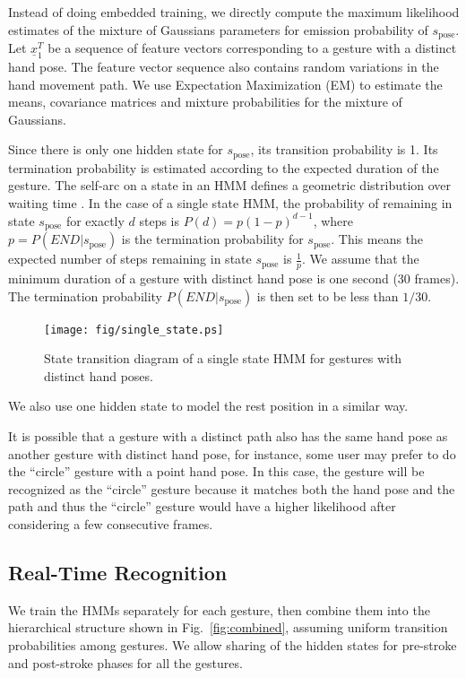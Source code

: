 Instead of doing embedded
training, we directly compute the maximum likelihood estimates of the mixture of
Gaussians parameters for emission probability of  $s_{\text{pose}}$. Let
$\underline{x}_1^T$ be a sequence of feature vectors corresponding to a gesture with a distinct hand pose. 
The feature vector sequence also contains random variations in the hand movement
path. 
We use Expectation Maximization (EM) to estimate the means, covariance matrices
and mixture probabilities for the mixture of Gaussians.

Since there is only one hidden state for $s_{\text{pose}}$, its transition
probability is 1. Its termination probability is estimated according to the
expected duration of the gesture. The self-arc on a state in an HMM defines a 
geometric distribution over waiting time \cite{murphy02}. In the case of a
single state HMM, the probability of remaining in state $s_{\text{pose}}$ for
exactly $d$ steps is $P(d) = p(1-p)^{d - 1}$, where $p = P(END|s_\text{pose})$
is the termination probability for $s_{\text{pose}}$. This means the expected
number of steps remaining in state $s_{\text{pose}}$ is $\frac{1}{p}$. We assume
that the minimum duration of a gesture with distinct hand pose is one second
(30 frames). The termination probability $P(END|s_\text{pose})$ is then set to
be less than $1/30$.

\begin{figure}[t]
\centering
\texttt{[image: fig/single\_state.ps]}
\caption{State transition diagram of a single state HMM for gestures with
distinct hand poses. }
\label{fig:single}
\end{figure}

We also use one hidden state to model the rest position in a similar way.

It is possible that a gesture with a distinct path also has the same hand pose
as another gesture with distinct hand pose, for instance, some user may prefer
to do the ``circle'' gesture with a point hand pose. In this case, the gesture
will be recognized as the ``circle'' gesture because it matches both the hand
pose and the path and thus the ``circle'' gesture would have a higher likelihood
after considering a few consecutive frames.

\subsection{Real-Time Recognition}
We train the HMMs separately for each gesture, then combine them into the
hierarchical structure shown in Fig.~\ref{fig:combined}, assuming uniform
transition probabilities among gestures.
We allow sharing of the hidden states for pre-stroke and post-stroke phases for all the gestures. 

